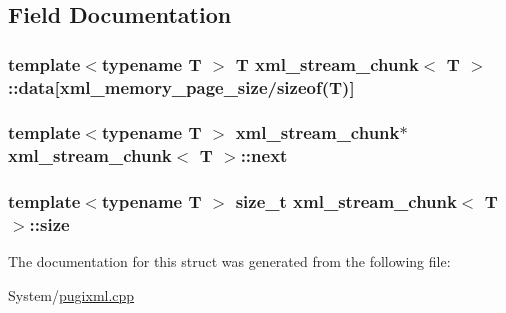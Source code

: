 \subsection{Field Documentation}
\hypertarget{structxml__stream__chunk_a365e2e228a0277467b25a0fea42b8518}{
\subsubsection[{data}]{\setlength{\rightskip}{0pt plus 5cm}template$<$typename T $>$ T {\bf xml\-\_\-stream\-\_\-chunk}$<$ T $>$\-::data\mbox{[}{\bf xml\-\_\-memory\-\_\-page\-\_\-size}/sizeof(T)\mbox{]}}}\label{structxml__stream__chunk_a365e2e228a0277467b25a0fea42b8518}
\hypertarget{structxml__stream__chunk_ad00071f7340adb2bde7c4157d4100b3c}{
\subsubsection[{next}]{\setlength{\rightskip}{0pt plus 5cm}template$<$typename T $>$ {\bf xml\-\_\-stream\-\_\-chunk}$\ast$ {\bf xml\-\_\-stream\-\_\-chunk}$<$ T $>$\-::next}}\label{structxml__stream__chunk_ad00071f7340adb2bde7c4157d4100b3c}
\hypertarget{structxml__stream__chunk_a42618ba3b7bda1246cfc640149fc34eb}{
\subsubsection[{size}]{\setlength{\rightskip}{0pt plus 5cm}template$<$typename T $>$ size\-\_\-t {\bf xml\-\_\-stream\-\_\-chunk}$<$ T $>$\-::size}}\label{structxml__stream__chunk_a42618ba3b7bda1246cfc640149fc34eb}


The documentation for this struct was generated from the following file\-:\begin{DoxyCompactItemize}
\item 
System/\hyperlink{pugixml_8cpp}{pugixml.\-cpp}\end{DoxyCompactItemize}
